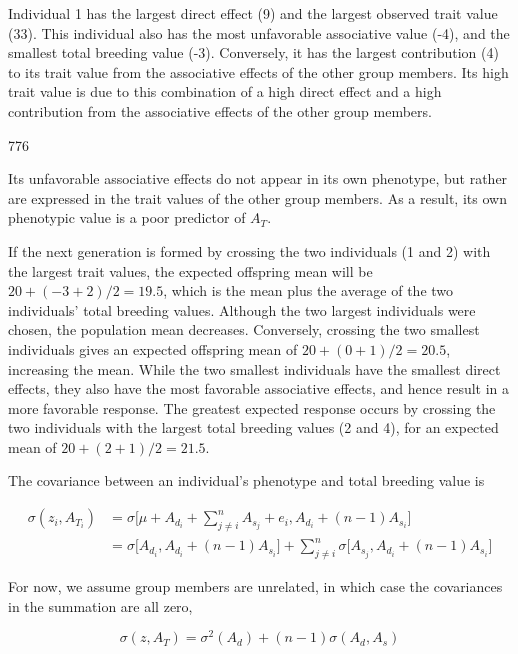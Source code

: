\documentclass{article}
\begin{document}
Individual 1 has the largest direct effect (9) and the largest observed trait value (33). This individual also has the most unfavorable associative value (-4), and the smallest total breeding value (-3). Conversely, it has the largest contribution (4) to its trait value from the associative effects of the other group members. Its high trait value is due to this combination of a high direct effect and a high contribution from the associative effects of the other group members.

776

Its unfavorable associative effects do not appear in its own phenotype, but rather are expressed in the trait values of the other group members. As a result, its own phenotypic value is a poor predictor of  $ A_{T} $.

If the next generation is formed by crossing the two individuals (1 and 2) with the largest trait values, the expected offspring mean will be  $ 20 + (-3 + 2)/2 = 19.5 $, which is the mean plus the average of the two individuals' total breeding values. Although the two largest individuals were chosen, the population mean decreases. Conversely, crossing the two smallest individuals gives an expected offspring mean of  $ 20 + (0 + 1)/2 = 20.5 $, increasing the mean. While the two smallest individuals have the smallest direct effects, they also have the most favorable associative effects, and hence result in a more favorable response. The greatest expected response occurs by crossing the two individuals with the largest total breeding values (2 and 4), for an expected mean of  $ 20 + (2 + 1)/2 = 21.5 $.

The covariance between an individual’s phenotype and total breeding value is

\begin{equation}
\begin{align*}\sigma(z_{i},A_{T_{i}})&=\sigma\bigg[\mu+A_{d_{i}}+\sum_{j\neq i}^{n}A_{s_{j}}+e_{i},A_{d_{i}}+(n-1)A_{s_{i}}\bigg]\\&=\sigma\bigg[A_{d_{i}},A_{d_{i}}+(n-1)A_{s_{i}}\bigg]+\sum_{j\neq i}^{n}\sigma\bigg[A_{s_{j}},A_{d_{i}}+(n-1)A_{s_{i}}\bigg]\end{align*}
\tag{22.4a}
\label{eq:22_4a}
\end{equation}

For now, we assume group members are unrelated, in which case the covariances in the summation are all zero,

\begin{equation}
\sigma(z,A_{T})=\sigma^{2}(A_{d})+(n-1)\sigma(A_{d},A_{s})
\tag{22.4b}
\label{eq:22_4b}
\end{equation}
\end{document}
